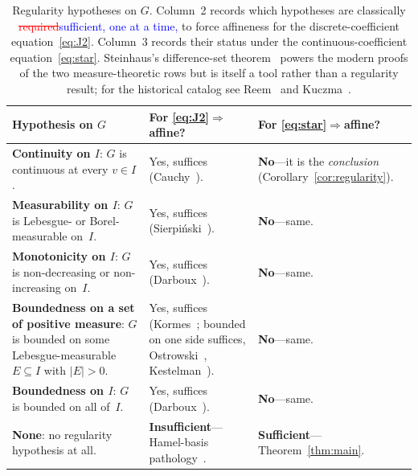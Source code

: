 \documentclass{article}
\newcommand{\ReviewAdd}[1]{\textcolor{blue}{#1}}
\newcommand{\ReviewDel}[1]{\textcolor{red}{\sout{#1}}}
\theoremstyle{plain}
\theoremstyle{definition}
\begin{document}
\begin{table}[ht]
\renewcommand{\arraystretch}{1.4}
\centering
\begin{tabularx}{\linewidth}{@{} >{\raggedright\arraybackslash}X
  >{\raggedright\arraybackslash}X
  >{\raggedright\arraybackslash}X @{}}
\toprule
\textbf{Hypothesis on $G$} &
\textbf{For \eqref{eq:J2}$\Rightarrow$affine?} &
\textbf{For \eqref{eq:star}$\Rightarrow$affine?} \\
\midrule
\textbf{Continuity on $I$}: $G$ is continuous at every $v\in I$.
  & Yes, suffices (Cauchy~\cite{Cauchy1821}).
  & \textbf{No}---it is the \emph{conclusion} (Corollary~\ref{cor:regularity}). \\
\midrule
\textbf{Measurability on $I$}: $G$ is Lebesgue- or Borel-measurable on~$I$.
  & Yes, suffices (Sierpi\'nski~\cite{Sierpinski1920}).
  & \textbf{No}---same. \\
\midrule
\textbf{Monotonicity on $I$}: $G$ is non-decreasing or non-increasing on~$I$.
  & Yes, suffices (Darboux~\cite{Darboux1875}).
  & \textbf{No}---same. \\
\midrule
\textbf{Boundedness on a set of positive measure}: $G$ is bounded on some
  Lebesgue-measurable $E\subseteq I$ with $|E|>0$.
  & Yes, suffices (Kormes~\cite{Kormes1926}; bounded on one side
    suffices, Ostrowski~\cite{Ostrowski1929},
    Kestelman~\cite{Kestelman1947}).
  & \textbf{No}---same. \\
\midrule
\textbf{Boundedness on $I$}: $G$ is bounded on all of~$I$.
  & Yes, suffices (Darboux~\cite{Darboux1880}).
  & \textbf{No}---same. \\
\midrule
\textbf{None}: no regularity hypothesis at all.
  & \textbf{Insufficient}---Hamel-basis pathology~\cite{Hamel1905}.
  & \textbf{Sufficient}---Theorem~\ref{thm:main}. \\
\bottomrule
\end{tabularx}
\caption{Regularity hypotheses on $G$. Column~2 records which hypotheses
are classically \ReviewDel{required}\ReviewAdd{sufficient, one at a time,} to force affineness for the
discrete-coefficient equation~\eqref{eq:J2}. Column~3 records their
status under the continuous-coefficient equation~\eqref{eq:star}.
Steinhaus's difference-set theorem~\cite{Steinhaus1920} powers the
modern proofs of the two measure-theoretic rows but is itself a tool
rather than a regularity result; for the historical catalog see
Reem~\cite{Reem2017} and Kuczma~\cite[\S13.2]{Kuczma2009}.}
\label{tab:dictionary}
\end{table}
\end{document}
